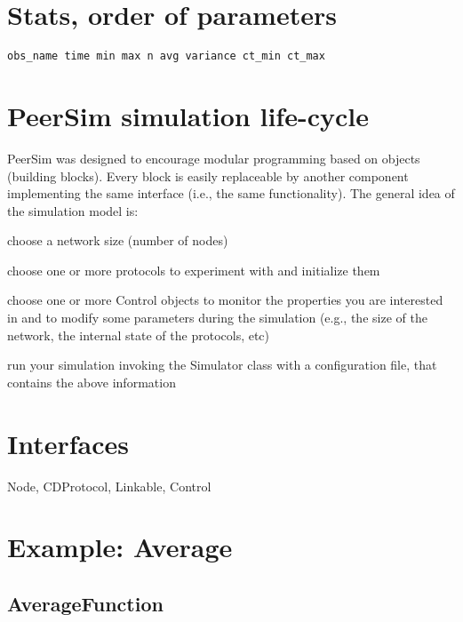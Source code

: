 \section{Stats, order of parameters}
\texttt{obs\_name time min max n avg variance ct\_min ct\_max}

\section{PeerSim simulation life-cycle}

PeerSim was designed to encourage modular programming based on objects (building blocks). Every block is easily replaceable by another component implementing the same interface (i.e., the same functionality). The general idea of the simulation model is:\\

\begin{compactenum}
\item choose a network size (number of nodes)
\item choose one or more protocols to experiment with and initialize them
\item choose one or more Control objects to monitor the properties you are interested in and to modify some parameters during the simulation (e.g., the size of the network, the internal state of the protocols, etc)
\item run your simulation invoking the Simulator class with a configuration file, that contains the above information
\end{compactenum}

\section{Interfaces}
Node, CDProtocol, Linkable, Control

\section{Example: Average}

\subsection{AverageFunction}

